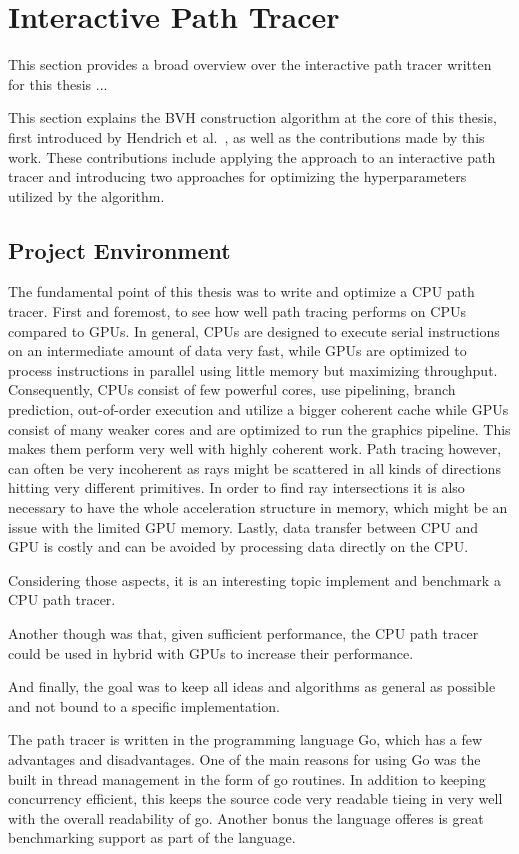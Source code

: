 \section{Interactive Path Tracer}
This section provides a broad overview over the interactive path tracer written for this thesis ...

This section explains the BVH construction algorithm at the core of this thesis, first introduced by Hendrich et al.~\cite{hendrich_parallel_2017}, as well as the contributions made by this work. These contributions include applying the approach to an interactive path tracer and introducing two approaches for optimizing the hyperparameters utilized by the algorithm. 

\subsection{Project Environment}
The fundamental point of this thesis was to write and optimize a CPU path tracer. First and foremost, to see how well path tracing performs on CPUs compared to GPUs. In general, CPUs are designed to execute serial instructions on an intermediate amount of data very fast, while GPUs are optimized to process instructions in parallel using little memory but maximizing throughput. Consequently, CPUs consist of few powerful cores, use pipelining, branch prediction, out-of-order execution and utilize a bigger coherent cache while GPUs consist of many weaker cores and are optimized to run the graphics pipeline. This makes them perform very well with highly coherent work. Path tracing however, can often be very incoherent as rays might be scattered in all kinds of directions hitting very different primitives. In order to find ray intersections it is also necessary to have the whole acceleration structure in memory, which might be an issue with the limited GPU memory. Lastly, data transfer between CPU and GPU is costly and can be avoided by processing data directly on the CPU. 

Considering those aspects, it is an interesting topic implement and benchmark a CPU path tracer.

Another though was that, given sufficient performance, the CPU path tracer could be used in hybrid with GPUs to increase their performance. 

And finally, the goal was to keep all ideas and algorithms as general as possible and not bound to a specific implementation.

The path tracer is written in the programming language Go, which has a few advantages and disadvantages. One of the main reasons for using Go was the built in thread management in the form of go routines. %
In addition to keeping concurrency efficient, this keeps the source code very readable tieing in very well with the overall readability of go. Another bonus the language offeres is great benchmarking support as part of the language.

